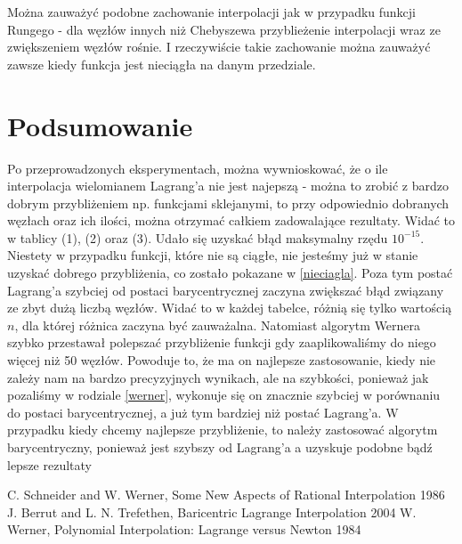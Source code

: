 \documentclass[11pt, wide]{article}
\begin{document}
Można zauważyć podobne zachowanie interpolacji jak w przypadku funkcji Rungego - dla węzłów innych
niż Chebyszewa przyblieżenie interpolacji wraz ze zwiększeniem węzłów rośnie. I rzeczywiście
takie zachowanie można zauważyć zawsze kiedy funkcja jest nieciągła na danym przedziale.
\section{Podsumowanie}
Po przeprowadzonych eksperymentach, można wywnioskować, że o ile interpolacja
wielomianem Lagrang'a nie jest najepszą - można to zrobić 
z bardzo dobrym przybliżeniem np. funkcjami sklejanymi, to przy odpowiednio dobranych węzłach oraz
ich ilości, można otrzymać całkiem zadowalające rezultaty. Widać to w tablicy (1), (2) oraz (3). Udało się
uzyskać błąd maksymalny rzędu $10^{-15}$. Niestety w przypadku funkcji, które nie są ciągłe, nie jesteśmy już w stanie
uzyskać dobrego przybliżenia, co zostało pokazane w \ref{nieciagla}. Poza tym postać Lagrang'a szybciej od postaci barycentrycznej zaczyna
zwiększać błąd związany ze zbyt dużą liczbą węzłów. Widać to w każdej tabelce,
różnią się tylko wartością $n$, dla której różnica zaczyna być zauważalna. Natomiast algorytm
Wernera szybko przestawał polepszać przybliżenie funkcji gdy zaaplikowaliśmy do niego więcej niż 50 węzłów. 
Powoduje to, że ma on najlepsze zastosowanie, kiedy nie zależy nam na bardzo precyzyjnych wynikach, ale na szybkości, ponieważ
jak pozaliśmy w rodziale \ref{werner}, wykonuje się on znacznie szybciej w porównaniu do postaci barycentrycznej, a już tym bardziej niż 
postać Lagrang'a. W przypadku kiedy chcemy najlepsze przybliżenie, to należy zastosować algorytm barycentryczny, ponieważ jest szybszy od Lagrang'a a uzyskuje
podobne bądź lepsze rezultaty
\begin{thebibliography}{9}
    \itemsep2pt
     C. Schneider and W. Werner, Some New Aspects of Rational Interpolation 1986
     J. Berrut and L. N. Trefethen, Baricentric Lagrange Interpolation 2004
     W. Werner, Polynomial Interpolation: Lagrange versus Newton 1984
\end{thebibliography}    
\end{document}
